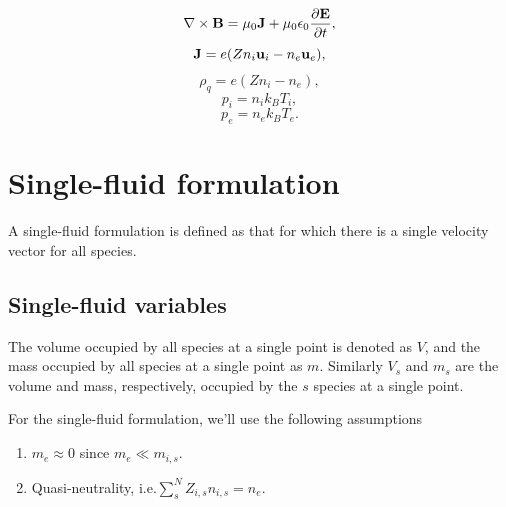 \documentclass[a4paper,11pt]{report}
\begin{document}
\begin{equation}
    \label{eq:p_waves_maxwell_2}
    \nabla \times \mathbf{B} = \mu_0 \mathbf{J} + \mu_0 \epsilon_0 \frac{\partial \mathbf{E}}{\partial t},
\end{equation}
\begin{equation}
    \label{eq:p_waves_curr_density}
    \mathbf{J} = e (Z n_i \mathbf{u}_i - n_e \mathbf{u}_e),
\end{equation}
\begin{equation}
    \label{eq:p_waves_mass_density}
    \rho_q = e (Z n_i - n_e),
\end{equation}
\begin{equation}
    p_i = n_i k_B T_i,
\end{equation}
\begin{equation}
    p_e = n_e k_B T_e.
\end{equation}

\section{Single-fluid formulation}
A single-fluid formulation is defined as that for which there is a single velocity vector for all species.

\subsection{Single-fluid variables}
 The volume occupied by all species at a single point is denoted as $V$, and the mass occupied by all species at a single point as $m$. Similarly $V_s$ and $m_s$ are the volume and mass, respectively, occupied by the $s$ species at a single point. 

For the single-fluid formulation, we'll use the following assumptions
\begin{enumerate}
    \item $m_e \approx 0$ since $m_e \ll m_{i,s}$. \label{eq:sf_no_e_mass} 
    \item Quasi-neutrality, i.e.\@ $\sum_s^N Z_{i,s} n_{i,s} = n_e$. \label{eq:sf_quasi_neutrality}
\end{enumerate}
\end{document}
